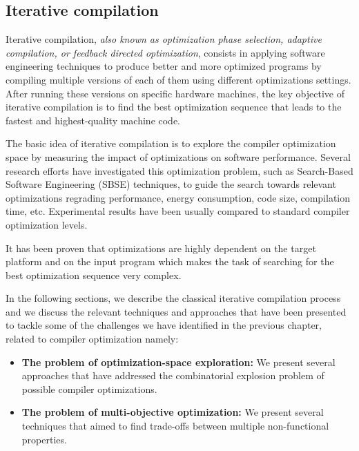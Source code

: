 \subsection{Iterative compilation}
Iterative compilation, \textit{also known as optimization phase selection, adaptive compilation, or feedback directed optimization}\cite{triantafyllis2003compiler}, consists in applying software engineering techniques to produce better and more optimized programs by compiling multiple versions of each of them using different optimizations settings. After running these versions on specific hardware machines, the key objective of iterative compilation is to find the best optimization sequence that leads to the fastest and highest-quality machine code. 

The basic idea of iterative compilation is to explore the compiler optimization space by measuring the impact of optimizations on software performance.
Several research efforts have investigated this optimization problem, such as Search-Based Software Engineering (SBSE) techniques, to guide the search towards relevant optimizations regrading performance, energy consumption, code size, compilation time, etc. Experimental results have been usually compared to standard compiler optimization levels.  

It has been proven that optimizations are highly dependent on the target platform and on the input program which makes the task of searching for the best optimization sequence very complex\cite{triantafyllis2003compiler}.

In the following sections, we describe the classical iterative compilation process and we discuss the relevant techniques and approaches that have been presented to tackle some of the challenges we have identified in the previous chapter, related to compiler optimization namely:
\begin{itemize}
	\item \textbf{The problem of optimization-space exploration:} We present several approaches that have addressed the combinatorial explosion problem of possible compiler optimizations.
	
	\item \textbf{The problem of multi-objective optimization:} We present several techniques that aimed to find trade-offs between multiple non-functional properties.
		
\end{itemize}

